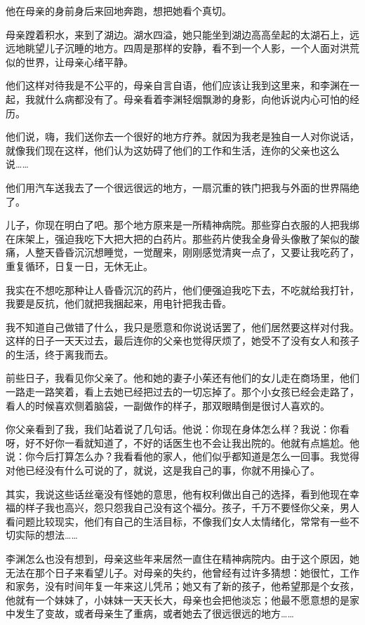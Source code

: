 \documentclass[UTF8]{ctexart}
\begin{document}
他在母亲的身前身后来回地奔跑，想把她看个真切。

母亲蹚着积水，来到了湖边。湖水四溢，她只能坐到湖边高高垒起的太湖石上，远远地眺望儿子沉睡的地方。四周是那样的安静，看不到一个人影，一个人面对洪荒似的世界，让母亲心绪平静。

他们这样对待我是不公平的，母亲自言自语，他们应该让我到这里来，和李渊在一起，我就什么病都没有了。母亲看着李渊轻烟飘渺的身影，向他诉说内心可怕的经历。

他们说，嗨，我们送你去一个很好的地方疗养。就因为我老是独自一人对你说话，就像我们现在这样，他们认为这妨碍了他们的工作和生活，连你的父亲也这么说\ldots\ldots{}

他们用汽车送我去了一个很远很远的地方，一扇沉重的铁门把我与外面的世界隔绝了。

儿子，你现在明白了吧。那个地方原来是一所精神病院。那些穿白衣服的人把我绑在床架上，强迫我吃下大把大把的白药片。那些药片使我全身骨头像散了架似的酸痛，人整天昏昏沉沉想睡觉，一觉醒来，刚刚感觉清爽一点了，又要让我吃药了，重复循环，日复一日，无休无止。

我实在不想吃那种让人昏昏沉沉的药片，他们便强迫我吃下去，不吃就给我打针，我要是反抗，他们就把我捆起来，用电针把我击昏。

我不知道自己做错了什么，我只是愿意和你说说话罢了，他们居然要这样对付我。这样的日子一天天过去，最后连你的父亲也觉得厌烦了，她受不了没有女人和孩子的生活，终于离我而去。

前些日子，我看见你父亲了。他和她的妻子小茱还有他们的女儿走在商场里，他们一路走一路笑着，看上去她已经把过去的一切忘掉了。那个小女孩已经会走路了，看人的时候喜欢侧着脑袋，一副做作的样子，那双眼睛倒是很讨人喜欢的。

你父亲看到了我，我们站着说了几句话。他说：你现在身体怎么样？我说：你看呀，好不好你一看就知道了，不好的话医生也不会让我出院的。他就有点尴尬。他说：你今后打算怎么办？我看看他的家人，他们似乎都知道是怎么一回事。我觉得对他已经没有什么可说的了，就说，这是我自己的事，你就不用操心了。

其实，我说这些话丝毫没有怪她的意思，他有权利做出自己的选择，看到他现在幸福的样子我也高兴，怨只怨我自己没有这个福分。孩子，千万不要怪你父亲，男人看问题比较现实，他们有自己的生活目标，不像我们女人太情绪化，常常有一些不切实际的想法\ldots\ldots{}

李渊怎么也没有想到，母亲这些年来居然一直住在精神病院内。由于这个原因，她无法在那个日子来看望儿子。对母亲的失约，他曾经有过许多猜想：她很忙，工作和家务，没有时间年复一年来这儿凭吊；她又有了新的孩子，他希望那是个女孩，他就有一个妹妹了，小妹妹一天天长大，母亲也会把他淡忘；他最不愿意想的是家中发生了变故，或者母亲生了重病，或者她去了很远很远的地方\ldots\ldots{}
\end{document}
